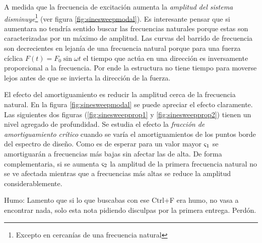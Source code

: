 \documentclass[onecolumn,10pt,titlepage,a4paper]{article}
\begin{document}
A medida que la frecuencia de excitación aumenta la \textit{amplitud del sistema disminuye}\footnote{Excepto en cercanías de una frecuencia natural} (ver figura \ref{fig:sinesweepmodal}). Es interesante pensar que si aumentara no tendría sentido buscar las frecuencias naturales porque estas son caracterizadas por un máximo de amplitud. Las curvas del barrido de frecuencia son decrecientes en lejanía de una frecuencia natural porque para una fuerza cíclica $F(t)=F_0\sin \omega t$ el tiempo que actúa en una dirección es inversamente proporcional a la frecuencia. Por ende la estructura no tiene tiempo para moverse lejos antes de que se invierta la dirección de la fuerza.

El efecto del amortiguamiento es reducir la amplitud cerca de la frecuencia natural. En la figura \ref{fig:sinesweepmodal} se puede apreciar el efecto claramente. Las siguientes dos figuras (\ref{fig:sinesweepprop1} y \ref{fig:sinesweepprop2}) tienen un nivel agregado de profundidad. Se estudia el efecto la \textit{fracción de amortiguamiento crítico} \cite{cook2007concepts} cuando se varía el amortiguamientos de los puntos borde del espectro de diseño. Como es de esperar para un valor mayor $\varsigma_1$ se amortiguarán a frecuencias más bajas sin afectar las de alta. De forma complementaria, si se aumenta $\varsigma_2$ la amplitud de la primera frecuencia natural no se ve afectada mientras que a frecuencias más altas se reduce la amplitud considerablemente.

 {\color{white} Humo: Lamento que si lo que buscabas con ese Ctrl+F era humo, no vasa a encontrar nada, solo esta nota pidiendo disculpas por la primera entrega. Perdón.}

 
\end{document}
